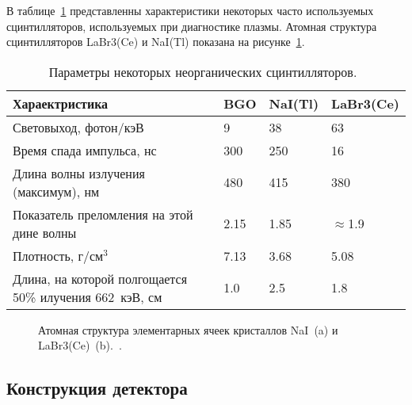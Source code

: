 В таблице~\ref{tab:scintiilatorProperties} представленны характеристики некоторых часто используемых сцинтилляторов, используемых при диагностике плазмы. Атомная структура сцинтилляторов LaBr3(Ce) и NaI(Tl) показана на рисунке~\ref{fig:scintillatorAtomicStructure}.

\begin{table} [htbp]
    \centering
    \begin{threeparttable}
      \caption{ Параметры некоторых неорганических сцинтилляторов.~\cite{Grozdanov2021} }
        \label{tab:scintiilatorProperties}
        \begin{tabular}{| p{7cm} | p{2cm} | p{2cm} | p{2cm} | }
            \hline
            Хараектристика   & BGO & NaI(Tl) & LaBr3(Ce) \\
            \hline
            Световыход, фотон/кэВ & 9 & 38 & 63 \\
            Время спада импульса, нс & 300 & 250 & 16 \\
            Длина волны излучения (максимум), нм & 480 & 415 & 380 \\
            Показатель преломления на этой дине волны & 2.15 & 1.85 & $\approx$1.9 \\
            Плотность, г/см${}^3$ & 7.13 & 3.68 & 5.08 \\
            Длина, на которой полгощается 50\% илучения 662~кэВ, см & 1.0 & 2.5 & 1.8 \\
            \hline
        \end{tabular}
    \end{threeparttable}
\end{table}

\begin{figure}[ht]
  \caption{ Атомная структура элементарных ячеек кристаллов NaI~(a) и LaBr3(Ce)~(b).~\cite{Schleife2016}.}
  \label{fig:scintillatorAtomicStructure}
\end{figure}




\subsection{Конструкция детектора}

